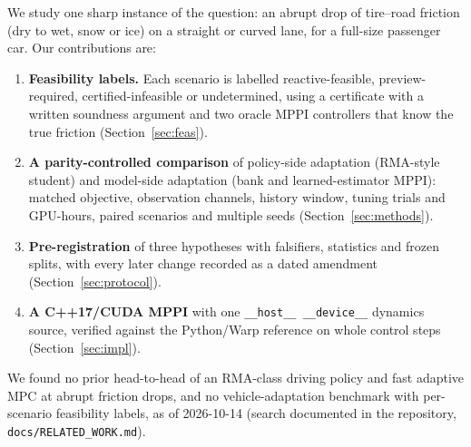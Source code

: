 \documentclass[11pt]{article}
\begin{document}
We study one sharp instance of the question: an abrupt drop of tire--road friction (dry to wet, snow or ice) on a
straight or curved lane, for a full-size passenger car. Our contributions are:
\begin{enumerate}
\item \textbf{Feasibility labels.} Each scenario is labelled reactive-feasible, preview-required,
  certified-infeasible or undetermined, using a certificate with a written soundness argument and two oracle MPPI
  controllers that know the true friction (Section~\ref{sec:feas}).
\item \textbf{A parity-controlled comparison} of policy-side adaptation (RMA-style student) and model-side
  adaptation (bank and learned-estimator MPPI): matched objective, observation channels, history window, tuning
  trials and GPU-hours, paired scenarios and multiple seeds (Section~\ref{sec:methods}).
\item \textbf{Pre-registration} of three hypotheses with falsifiers, statistics and frozen splits, with every
  later change recorded as a dated amendment (Section~\ref{sec:protocol}).
\item \textbf{A C++17/CUDA MPPI} with one \texttt{\_\_host\_\_ \_\_device\_\_} dynamics source, verified against the
  Python/Warp reference on whole control steps (Section~\ref{sec:impl}).
\end{enumerate}
We found no prior head-to-head of an RMA-class driving policy and fast adaptive MPC at abrupt friction drops, and
no vehicle-adaptation benchmark with per-scenario feasibility labels, as of 2026-10-14 (search documented in the
repository, \texttt{docs/RELATED\_WORK.md}).
\end{document}
